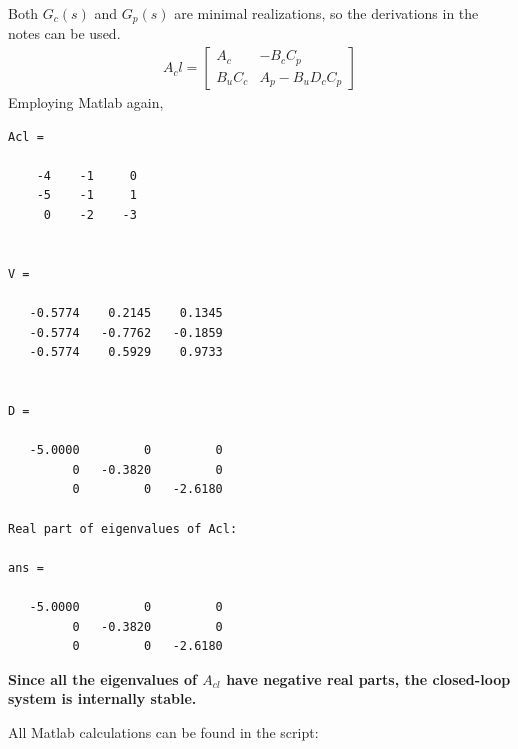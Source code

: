 Both $G_c(s)$ and $G_p(s)$ are minimal realizations, so the derivations in the notes can be used.
\begin{align*}
    A_cl = \begin{bmatrix}
        A_c & -B_c C_p \\
        B_u C_c & A_p - B_u D_c C_p
    \end{bmatrix} 
\end{align*}
Employing Matlab again,
\begin{verbatim}
Acl =

    -4    -1     0
    -5    -1     1
     0    -2    -3


V =

   -0.5774    0.2145    0.1345
   -0.5774   -0.7762   -0.1859
   -0.5774    0.5929    0.9733


D =

   -5.0000         0         0
         0   -0.3820         0
         0         0   -2.6180

Real part of eigenvalues of Acl: 

ans =

   -5.0000         0         0
         0   -0.3820         0
         0         0   -2.6180
\end{verbatim}

\textbf{Since all the eigenvalues of $A_{cl}$ have negative real parts, the closed-loop system is internally stable.}

All Matlab calculations can be found in the script:


\subsection{}
